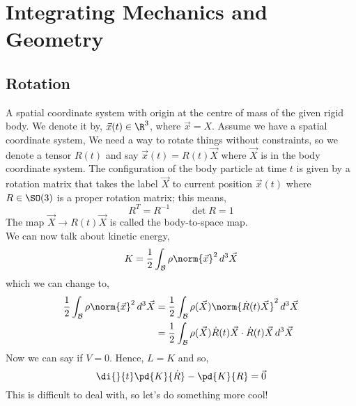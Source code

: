 
\section{Integrating Mechanics and Geometry}

\subsection{Rotation}
A spatial coordinate system with origin at the centre of mass of the given rigid body. We denote it by, $\vec{x}(t) \in \R^3$, where $\vec x = X$. Assume we have a spatial coordinate system,
We need a way to rotate things without constraints, so we denote a tensor $R(t)$ and say $\vec x(t) = R(t)\vec X$ where $\vec X$ is in the body coordinate system. The configuration of the body particle at time $t$ is given by a rotation matrix that takes the label $\vec X$ to current position $\vec x(t)$ where $R \in \SO(3)$ is a proper rotation matrix; this means,
$$ R^T = R^{-1} \qquad \det R = 1 $$
The map $\vec X \to R(t)\vec X$ is called the body-to-space map. \\

We can now talk about kinetic energy,
$$ K = \frac{1}{2}\int_\mathcal{B} \rho \norm{\vec x}^2\, d^3\vec X$$
which we can change to,
\begin{align*}
  \frac{1}{2}\int_\mathcal{B} \rho \norm{\vec x}^2\, d^3\vec X &= \frac{1}{2}\int_\mathcal{B} \rho(\vec X)\norm{\dot R(t)\vec X}^2 \,d^3\vec X\\
  &= \frac{1}{2}\int_\mathcal{B} \rho(\vec X)\dot R(t)\vec X \cdot \dot R(t)\vec X \,d^3\vec X\\
\end{align*}
Now we can say if $V = 0$. Hence, $L = K$ and so,
$$ \di{}{t}\pd{K}{\dot R} - \pd{K}{R} = \vec 0 $$
This is difficult to deal with, so let's do something more cool! \\

